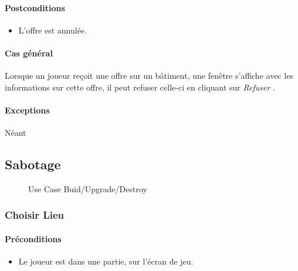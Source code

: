 \documentclass[a4paper,11pt]{report}
\begin{document}
\paragraph{Postconditions}
\begin{itemize}
 \item L'offre est annulée.
\end{itemize}
\paragraph{Cas général}
Lorsque un joueur reçoit une offre sur un bâtiment, une fenêtre s'affiche avec les informations sur cette offre, il peut refuser celle-ci en cliquant sur \og \textit{Refuser} \fg.
\paragraph{Exceptions} Néant


\newpage
\subsection{Sabotage}
\begin{figure}[ht]
	\caption{Use Case Buid/Upgrade/Destroy}
\end{figure}

\subsubsection{Choisir Lieu}
\paragraph{Préconditions}
\begin{itemize}
	\item Le joueur est dans une partie, sur l'écran de jeu.
\end{itemize}
\end{document}
